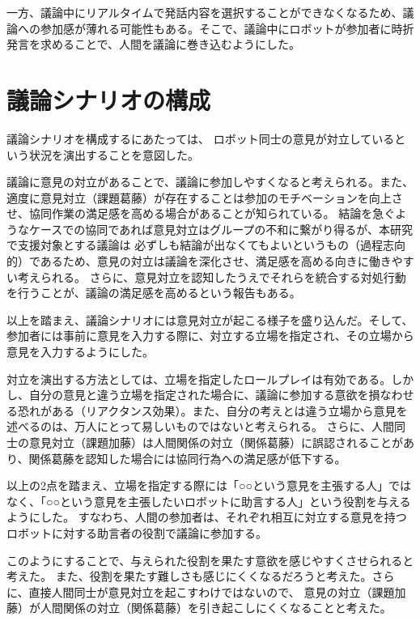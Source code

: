 \documentclass[11pt, a4paper]{jreport} %
\begin{document}
一方、議論中にリアルタイムで発話内容を選択することができなくなるため、議論への参加感が薄れる可能性もある。そこで、議論中にロボットが参加者に時折発言を求めることで、人間を議論に巻き込むようにした。


\section{議論シナリオの構成}
議論シナリオを構成するにあたっては、
ロボット同士の意見が対立しているという状況を演出することを意図した。


議論に意見の対立があることで、議論に参加しやすくなると考えられる。また、適度に意見対立（課題葛藤）が存在することは参加のモチベーションを向上させ、協同作業の満足感を高める場合がある\cite{doi:10.1002/job.180}ことが知られている。
結論を急ぐようなケースでの協同であれば意見対立はグループの不和に繋がり得るが、本研究で支援対象とする議論は
必ずしも結論が出なくてもよいというもの（過程志向的）であるため、意見の対立は議論を深化させ、満足感を高める向きに働きやすい考えられる。
さらに、意見対立を認知したうえでそれらを統合する対処行動を行うことが、議論の満足感を高めるという報告\cite{村山綾20141203}もある。


以上を踏まえ、議論シナリオには意見対立が起こる様子を盛り込んだ。そして、参加者には事前に意見を入力する際に、対立する立場を指定され、その立場から意見を入力するようにした。


対立を演出する方法としては、立場を指定したロールプレイは有効である。しかし、自分の意見と違う立場を指定された場合に、議論に参加する意欲を損なわせる恐れがある（リアクタンス効果\cite{PMID:13318848}）。また、自分の考えとは違う立場から意見を述べるのは、万人にとって易しいものではないと考えられる。
さらに、人間同士の意見対立（課題加藤）は人間関係の対立（関係葛藤）に誤認されることがあり\cite{村山綾2012KJ00008195843}、関係葛藤を認知した場合には協同行為への満足感が低下する\cite{10.2307/2393638}。

以上の2点を踏まえ、立場を指定する際には「○○という意見を主張する人」ではなく、「○○という意見を主張したいロボットに助言する人」という役割を与えるようにした。
すなわち、人間の参加者は、それぞれ相互に対立する意見を持つロボットに対する助言者の役割で議論に参加する。

このようにすることで、与えられた役割を果たす意欲を感じやすくさせられると考えた。
また、役割を果たす難しさも感じにくくなるだろうと考えた。さらに、直接人間同士が意見対立を起こすわけではないので、
意見の対立（課題加藤）が人間関係の対立（関係葛藤）を引き起こしにくくなることと考えた。
\end{document}
